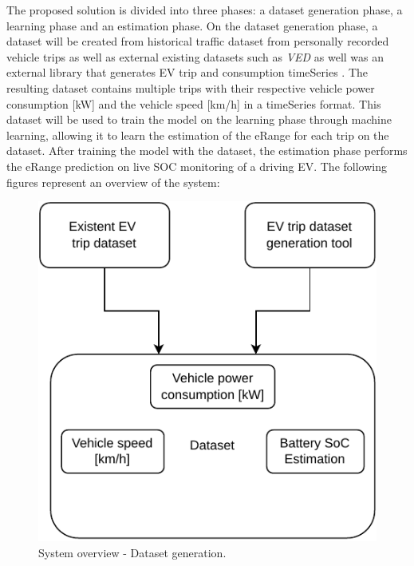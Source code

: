 The proposed solution is divided into three phases: 
a \gls{dataset} generation phase, a learning phase
and an estimation phase.
On the \gls{dataset} generation phase, a \gls{dataset}
will be created from historical traffic dataset
from personally recorded vehicle trips as well as
external existing datasets such as \textit{VED} \citep{vedDataset}
as well was an external library that generates 
\gls{EV} trip and consumption \gls{timeSeries} \citep{emobpy}.
The resulting dataset contains multiple
trips with their respective vehicle power consumption [kW]
and the vehicle speed [km/h] in a  \gls{timeSeries} format.
This \gls{dataset} will be used to train the model
on the learning phase through machine learning, 
allowing it to learn the estimation of 
the \gls{eRange} for each trip on the \gls{dataset}.
After training the model with the dataset,
the estimation phase performs the \gls{eRange} prediction
on live \gls{SOC} monitoring of a driving \gls{EV}.
The following figures represent an overview of the system:


\begin{figure}[H]
    \begin{center}
        \includegraphics[scale=1.0]{../figures/generic_diagram_dataset_generation_phase}
        \caption{System overview - Dataset generation.}
    \end{center}
\end{figure}

